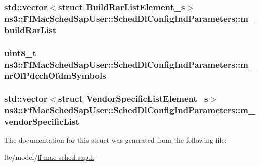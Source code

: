 \subsubsection[{\texorpdfstring{m\+\_\+build\+Rar\+List}{m_buildRarList}}]{\setlength{\rightskip}{0pt plus 5cm}std\+::vector$<$struct {\bf Build\+Rar\+List\+Element\+\_\+s}$>$ ns3\+::\+Ff\+Mac\+Sched\+Sap\+User\+::\+Sched\+Dl\+Config\+Ind\+Parameters\+::m\+\_\+build\+Rar\+List}\hypertarget{structns3_1_1FfMacSchedSapUser_1_1SchedDlConfigIndParameters_abeb9922a08b6cb878a10d9422150b900}{}\label{structns3_1_1FfMacSchedSapUser_1_1SchedDlConfigIndParameters_abeb9922a08b6cb878a10d9422150b900}
\subsubsection[{\texorpdfstring{m\+\_\+nr\+Of\+Pdcch\+Ofdm\+Symbols}{m_nrOfPdcchOfdmSymbols}}]{\setlength{\rightskip}{0pt plus 5cm}uint8\+\_\+t ns3\+::\+Ff\+Mac\+Sched\+Sap\+User\+::\+Sched\+Dl\+Config\+Ind\+Parameters\+::m\+\_\+nr\+Of\+Pdcch\+Ofdm\+Symbols}\hypertarget{structns3_1_1FfMacSchedSapUser_1_1SchedDlConfigIndParameters_a442f6814cd1091f617705f21648320cc}{}\label{structns3_1_1FfMacSchedSapUser_1_1SchedDlConfigIndParameters_a442f6814cd1091f617705f21648320cc}
\subsubsection[{\texorpdfstring{m\+\_\+vendor\+Specific\+List}{m_vendorSpecificList}}]{\setlength{\rightskip}{0pt plus 5cm}std\+::vector$<$struct {\bf Vendor\+Specific\+List\+Element\+\_\+s}$>$ ns3\+::\+Ff\+Mac\+Sched\+Sap\+User\+::\+Sched\+Dl\+Config\+Ind\+Parameters\+::m\+\_\+vendor\+Specific\+List}\hypertarget{structns3_1_1FfMacSchedSapUser_1_1SchedDlConfigIndParameters_a8f4dc187f23f2ef682b4ac6ecab8d7be}{}\label{structns3_1_1FfMacSchedSapUser_1_1SchedDlConfigIndParameters_a8f4dc187f23f2ef682b4ac6ecab8d7be}


The documentation for this struct was generated from the following file\+:\begin{DoxyCompactItemize}
\item 
lte/model/\hyperlink{ff-mac-sched-sap_8h}{ff-\/mac-\/sched-\/sap.\+h}\end{DoxyCompactItemize}
